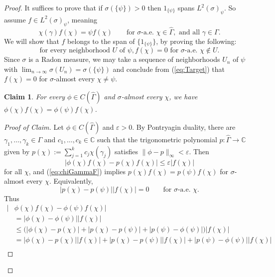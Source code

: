 \documentclass[12pt]{amsart} \usepackage{amsmath,centernot,amssymb,leftindex}
\newtheorem*{claim}{Claim}
\numberwithin{theorem}{section}
\numberwithin{equation}{section}
\theoremstyle{definition}
\begin{document}
\begin{proof}
	It suffices to prove that if $\sigma(\{\psi\})>0$ then $1_{\{\psi\}}$ spans $L^{2}(\sigma)_{\psi}$.  So assume $f\in L^{2}(\sigma)_{\psi}$, meaning \begin{equation}\label{eq:chiGammaF}\chi(\gamma)f(\chi)=\psi f(\chi) \qquad \text{for } \sigma\text{-a.e. } \chi\in \widehat{\Gamma}, \text{ and all } \gamma\in \Gamma.
	\end{equation}  We will show that $f$ belongs to the span of $\{1_{\{\psi\}}\}$, by proving the following:
	\begin{equation}\label{eq:Target} \text{for every neighborhood } U \text{ of } \psi, f(\chi)=0 \text{ for } \sigma\text{-a.e.  }\chi\notin U.
	\end{equation}  Since $\sigma$ is a Radon measure, we may take a sequence of neighborhoods $U_{n}$ of $\psi$ with $\lim_{n\to\infty}\sigma(U_{n})=\sigma(\{\psi\})$ and conclude from (\ref{eq:Target}) that $f(\chi)=0$ for $\sigma$-almost every $\chi\neq \psi$.
	\begin{claim}
		For every  $\phi\in C(\widehat{\Gamma})$ and $\sigma$-almost every $\chi$, we have $\phi(\chi)f(\chi)=\phi(\psi)f(\chi)$.
	\end{claim}
	\begin{proof}[Proof of Claim]
		Let $\phi \in C(\widehat{\Gamma})$ and $\varepsilon>0$.  By Pontryagin duality, there are $\gamma_{1},\dots, \gamma_{k}\in \Gamma$ and $c_{1},\dots,c_{k}\in \mathbb C$ such that the trigonometric polynomial $p:\widehat{\Gamma}\to \mathbb C$ given by $p(\chi):=\sum_{j=1}^{k} c_{j}\chi(\gamma_{j})$ satisfies $\|\phi-p\|_{\infty}<\varepsilon$.  Then \[|\phi(\chi)f(\chi)-p(\chi)f(\chi)|\leq \varepsilon|f(\chi)|\] for all $\chi$, and (\ref{eq:chiGammaF}) implies  $p(\chi)f(\chi)=p(\psi) f(\chi)$ for $\sigma$-almost every $\chi$.  Equivalently,
		\begin{equation}\label{eq:Rearranged}
			|p(\chi)-p(\psi)||f(\chi)|=0  \qquad \text{for } \sigma\text{-a.e. } \chi. 
		\end{equation}Thus 
		\begin{align*}
			|&\phi(\chi)f(\chi)-\phi(\psi)f(\chi)|\\
			&=\big|\phi(\chi)-\phi(\psi)\big||f(\chi)|\\
			&\leq \big(|\phi(\chi)-p(\chi)|+|p(\chi)-p(\psi)|+|p(\psi)-\phi(\psi)|\big)|f(\chi)|\\
			&= \big|\phi(\chi)-p(\chi)\big||f(\chi)|+\big|p(\chi)-p(\psi)\big||f(\chi)|+\big|p(\psi)-\phi(\psi)\big||f(\chi)| \\

\end{align*}
\end{proof}
\end{proof}
\end{document}
